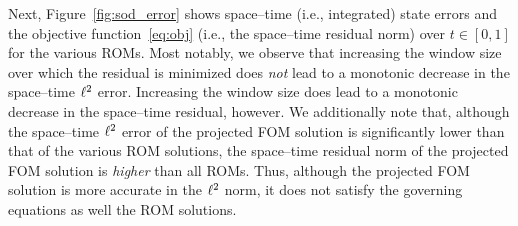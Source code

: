 Next, Figure~\ref{fig:sod_error} shows space--time (i.e., integrated) state errors and the objective function~\eqref{eq:obj} (i.e., the space--time residual norm) over $t \in [0,1]$ for the various ROMs. Most notably, we observe 
that increasing the window size over which the residual is minimized does \textit{not} lead to a monotonic decrease in the space--time $\ell^2$  
error. Increasing the window size does lead to a monotonic decrease in the space--time residual, however. We additionally note that, although the space--time
$\ell^2$ error of 
the projected FOM solution is significantly lower than that of the various ROM solutions, the space--time residual norm of the projected FOM solution is \textit{higher} 
than all ROMs. Thus, although the projected FOM solution is more accurate in the $\ell^2$ norm, it does not satisfy the governing equations as well the ROM solutions. 

